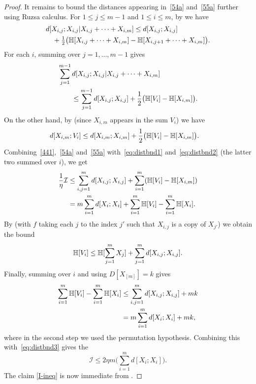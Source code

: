\begin{proof}
It remains to bound the distances appearing in~\eqref{54a} and~\eqref{55a} further using Ruzsa calculus.
For $1 \leq j \leq m-1$ and $1 \leq i \leq m$, by  we have
\begin{align*} &d[ X_{i,j}; X_{i,j}| X_{i,j}+\cdots+X_{i,m}]
\leq d[X_{i,j}; X_{i,j}] \\
&\quad + \tfrac{1}{2} \bigl(\mathbb{H}[X_{i,j}+\cdots+X_{i,m}] - \mathbb{H}[X_{i,{j+1}}+\cdots+X_{i,m}]\bigr).
\end{align*}
For each $i$, summing over $j = 1,\dots, m-1$ gives
\begin{align}
  \nonumber
  &\sum_{j=1}^{m-1} d[X_{i,j}; X_{i,j}| X_{i,j}+\cdots+X_{i,m}] \\
  &\qquad \leq \sum_{j=1}^{m-1} d[X_{i,j}; X_{i,j}] + \frac12 \bigl( \mathbb{H}[V_i] - \mathbb{H}[X_{i,m}] \bigr).
  \label{eq:distbnd1}
\end{align}
On the other hand, by  (since $X_{i,m}$ appears in the sum $V_i$) we have
\begin{align}
  d[X_{i,m}; V_i]
  &\leq d[X_{i,m}; X_{i,m}] + \frac12 \bigl( \mathbb{H}[V_i] - \mathbb{H}[X_{i,m}] \bigr).
  \label{eq:distbnd2}
\end{align}
Combining~\eqref{441},~\eqref{54a} and~\eqref{55a} with~\eqref{eq:distbnd1} and~\eqref{eq:distbnd2} (the latter two summed over $i$), we get
\begin{align}
  \nonumber
  \frac1{\eta} {\mathcal I} &\leq \sum_{i,j=1}^m d[X_{i,j};X_{i,j}] + \sum_{i=1}^m (\mathbb{H}[V_i] - \mathbb{H}[X_{i,m}]) \\
      &= m \sum_{i=1}^m d[X_i; X_i] + \sum_{i=1}^m \mathbb{H}[V_i] - \sum_{i=1}^m \mathbb{H}[X_i].
      \label{eq:distbnd3}
\end{align}
By  (with $f$ taking each $j$ to the index $j'$ such that $X_{i,j}$ is a copy of $X_{j'}$) we obtain the bound
\[
  \mathbb{H}[V_i] \leq \mathbb{H}[\sum_{j=1}^m X_j] + \sum_{j=1}^m d[X_{i,j}; X_{i,j}].
\]
Finally, summing over $i$ and using $D[X_{[m]}] = k$ gives
\begin{align*}
  \sum_{i=1}^m \mathbb{H}[V_i] - \sum_{i=1}^m \mathbb{H}[X_i] & \leq \sum_{i,j=1}^m d[X_{i,j}; X_{i,j}] + m k \\ & = m\sum_{i = 1}^m d[X_i; X_i] + mk,
\end{align*}
where in the second step we used the permutation hypothesis. Combining this with~\eqref{eq:distbnd3} gives the
$$
{\mathcal I} \leq 2\eta m \biggl( \sum_{i=1}^m d[X_i;X_i] \biggr).$$
The claim \eqref{I-ineq} is now immediate from .
\end{proof}

